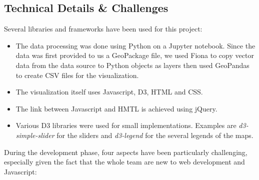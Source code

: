 \documentclass[12pt]{article}
\begin{document}
\subsection{Technical Details \& Challenges}
Several libraries and frameworks have been used for this project:
\begin{itemize}
    \item The data processing was done using Python on a Jupyter notebook. Since the data was first provided to us a GeoPackage file, we used Fiona to copy vector data from the data source to Python objects as layers then used GeoPandas to create CSV files for the visualization.
    \item The visualization itself uses Javascript, D3, HTML and CSS.
    \item The link between Javascript and HMTL is achieved using jQuery.
    \item Various D3 libraries were used for small implementations. Examples are \textit{d3-simple-slider} for the sliders and \textit{d3-legend} for the several legends of the maps. 
\end{itemize}
During the development phase, four aspects have been particularly challenging, especially given the fact that the whole team are new to web development and Javascript: 
\end{document}
